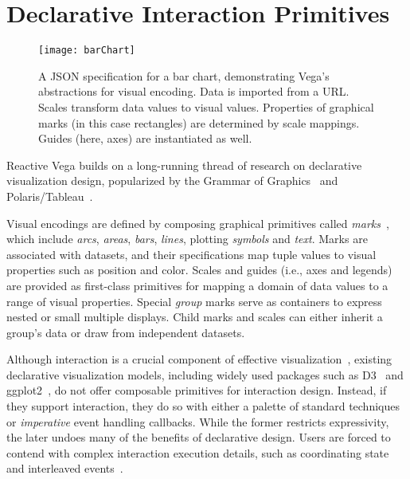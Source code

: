 \graphicspath{{./vega-lang/figures/}}
\chapter{Declarative Interaction Primitives}
\label{sec:vg:lang}

\vspace{-30pt}

\begin{figure}[b!]
  \centering
  \texttt{[image: barChart]}
  \caption{A JSON specification for a bar chart, demonstrating Vega's
  abstractions for visual encoding. Data is imported from a URL. Scales
  transform data values to visual values. Properties of graphical marks (in
  this case rectangles) are determined by scale mappings. Guides (here, axes)
  are instantiated as well.}
  \label{fig:vg:barChart}
\end{figure}

Reactive Vega builds on a long-running thread of research on declarative
visualization design, popularized by the Grammar of
Graphics~\cite{wilkinson:grammar} and Polaris/Tableau~\cite{stolte:polaris}.

Visual encodings are defined by composing graphical primitives called
\emph{marks}~\cite{bostock:protovis}, which include \emph{arcs}, \emph{areas},
\emph{bars}, \emph{lines}, plotting \emph{symbols} and \emph{text}. Marks are
associated with datasets, and their specifications map tuple values to visual
properties such as position and color. Scales and guides (i.e., axes and
legends) are provided as first-class primitives for mapping a domain of data
values to a range of visual properties. Special \emph{group} marks serve as
containers to express nested or small multiple displays. Child marks and scales
can either inherit a group's data or draw from independent datasets.

Although interaction is a crucial component of effective
visualization~\cite{liu:mentalmodels, pike:interactionscience}, existing
declarative visualization models, including widely used packages such as
D3~\cite{bostock:d3} and ggplot2~\cite{wickham:ggplot2}, do not offer composable
primitives for interaction design. Instead, if they support interaction, they do
so with either a palette of standard techniques~\cite{bostock:protovis,
bostock:d3} or \emph{imperative} event handling callbacks. While the former
restricts expressivity, the later undoes many of the benefits of declarative
design. Users are forced to contend with complex interaction execution details,
such as coordinating state and interleaved events~\cite{cooper:embedding,
edwards:coherent, myers:callbacks}.

